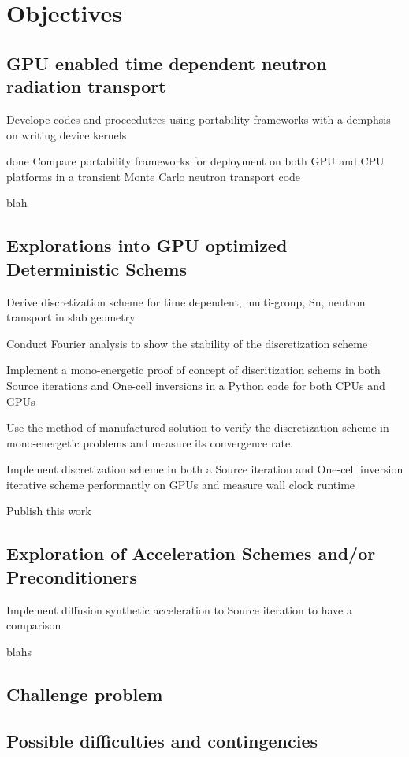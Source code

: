 \chapter{Objectives}
\label{ch:objectives}

\section{GPU enabled time dependent neutron radiation transport}
Develope codes and proceedutres using portability frameworks with a demphsis on writing device kernels 
\begin{todolist}
    \item[done] Compare portability frameworks for deployment on both GPU and CPU platforms in a transient Monte Carlo neutron transport code
    \item[] blah
\end{todolist}


\section{Explorations into GPU optimized Deterministic Schems}
\begin{todolist}
    \item[] Derive discretization scheme for time dependent, multi-group, Sn, neutron transport in slab geometry
    \item[] Conduct Fourier analysis to show the stability of the discretization scheme
    \item[] Implement a mono-energetic proof of concept of discritization schems in both Source iterations and One-cell inversions in a Python code for both CPUs and GPUs
    \item[] Use the method of manufactured solution to verify the discretization scheme in mono-energetic problems and measure its convergence rate.
    \item[] Implement discretization scheme in both a Source iteration and One-cell inversion iterative scheme performantly on GPUs and measure wall clock runtime
    \item[] Publish this work
\end{todolist}

\section{Exploration of Acceleration Schemes and/or Preconditioners}

\begin{todolist}
    \item[] Implement diffusion synthetic acceleration to Source iteration to have a comparison
    \item[] blahs
\end{todolist}

\section{Challenge problem}

\section{Possible difficulties and contingencies}